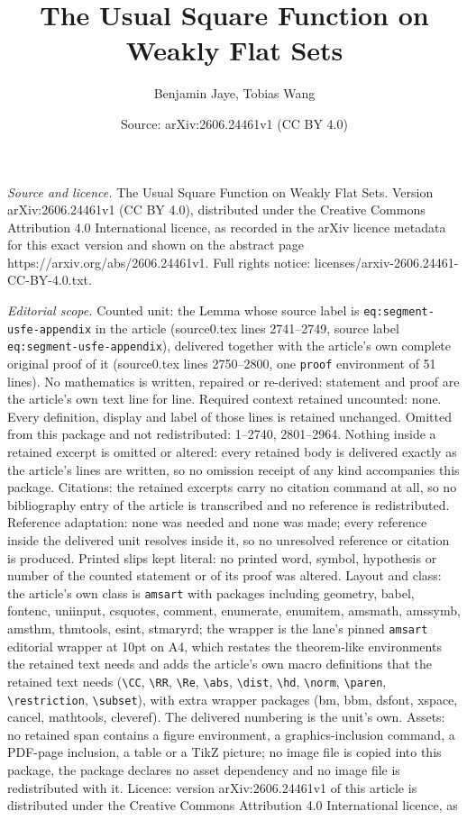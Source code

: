 \documentclass[10pt,a4paper]{amsart}
\title[The Usual Square Function on Weakly Flat Sets]{The Usual Square Function on Weakly Flat Sets}
\author{Benjamin Jaye, Tobias Wang}
\date{Source: arXiv:2606.24461v1 (CC BY 4.0)}
\begin{document}
\maketitle

\noindent\emph{Source and licence.} The Usual Square Function on Weakly Flat Sets. Version arXiv:2606.24461v1 (CC BY 4.0), distributed under the Creative Commons Attribution 4.0 International licence, as recorded in the arXiv licence metadata for this exact version and shown on the abstract page https://arxiv.org/abs/2606.24461v1. Full rights notice: licenses/arxiv-2606.24461-CC-BY-4.0.txt.\par\smallskip

\noindent\textit{Editorial scope.} Counted unit: the Lemma whose source label is \texttt{eq:segment-usfe-appendix} in the article (source0.tex lines 2741--2749, source label \texttt{eq:segment-usfe-appendix}), delivered together with the article's own complete original proof of it (source0.tex lines 2750--2800, one \texttt{proof} environment of 51 lines). No mathematics is written, repaired or re-derived: statement and proof are the article's own text line for line. Required context retained uncounted: none. Every definition, display and label of those lines is retained unchanged. Omitted from this package and not redistributed: 1--2740, 2801--2964. Nothing inside a retained excerpt is omitted or altered: every retained body is delivered exactly as the article's lines are written, so no omission receipt of any kind accompanies this package. Citations: the retained excerpts carry no citation command at all, so no bibliography entry of the article is transcribed and no reference is redistributed. Reference adaptation: none was needed and none was made; every reference inside the delivered unit resolves inside it, so no unresolved reference or citation is produced. Printed slips kept literal: no printed word, symbol, hypothesis or number of the counted statement or of its proof was altered. Layout and class: the article's own class is \texttt{amsart} with packages including geometry, babel, fontenc, uniinput, csquotes, comment, enumerate, enumitem, amsmath, amssymb, amsthm, thmtools, esint, stmaryrd; the wrapper is the lane's pinned \texttt{amsart} editorial wrapper at 10pt on A4, which restates the theorem-like environments the retained text needs and adds the article's own macro definitions that the retained text needs (\texttt{\textbackslash CC}, \texttt{\textbackslash RR}, \texttt{\textbackslash Re}, \texttt{\textbackslash abs}, \texttt{\textbackslash dist}, \texttt{\textbackslash hd}, \texttt{\textbackslash norm}, \texttt{\textbackslash paren}, \texttt{\textbackslash restriction}, \texttt{\textbackslash subset}), with extra wrapper packages (bm, bbm, dsfont, xspace, cancel, mathtools, cleveref). The delivered numbering is the unit's own. Assets: no retained span contains a figure environment, a graphics-inclusion command, a PDF-page inclusion, a table or a TikZ picture; no image file is copied into this package, the package declares no asset dependency and no image file is redistributed with it. Licence: version arXiv:2606.24461v1 of this article is distributed under the Creative Commons Attribution 4.0 International licence, as 
\end{document}
